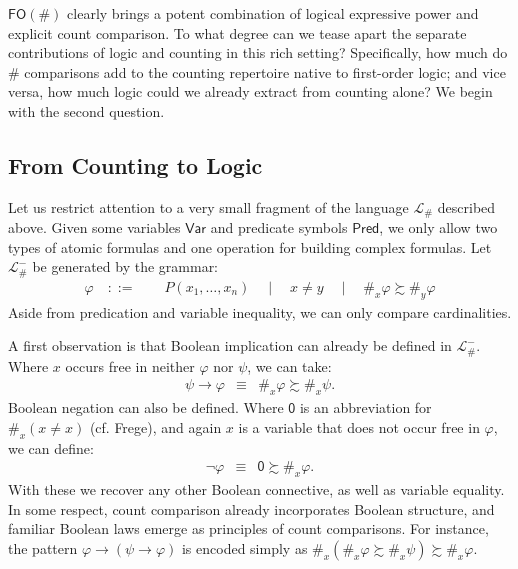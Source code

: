 \documentclass[12pt,oneside,reqno]{amsart}
\theoremstyle{definition}
\begin{document}
$\mathsf{FO}(\#)$ clearly brings a potent combination of logical expressive power and explicit count comparison.  To what degree can we tease apart the separate contributions of  logic and counting in this rich setting? Specifically, how much do $\#$ comparisons add to the counting repertoire native to first-order logic; and vice versa, how much logic could we already extract from counting alone? We begin with the second question. 

\subsection{From Counting to Logic} \label{section:countinglogic}
Let us restrict attention to a very small fragment of the language $\mathcal{L}_\#$ described above. Given some variables $\mathsf{Var}$ and predicate symbols $\mathsf{Pred}$, we only allow two types of atomic formulas and one operation for building complex formulas. Let $\mathcal{L}_\#^-$ be generated by the grammar: \begin{eqnarray*}
\varphi \quad::=\quad\quad   P(x_1,\dots,x_n) \quad\mid\quad x\neq y \quad\mid\quad \#_x\varphi \succsim \#_y\varphi
\end{eqnarray*} Aside from predication and variable inequality, we can only compare cardinalities.

A first observation is that Boolean implication can already be defined in $\mathcal{L}_\#^-$. Where $x$ occurs free in neither $\varphi$ nor $\psi$, we can take: 
\begin{eqnarray}
 \psi \rightarrow \varphi & \equiv & \#_x\varphi \succsim \#_x\psi. \label{implication}
\end{eqnarray}
Boolean negation can also be defined. Where $\mathsf{0}$ is an abbreviation for $\#_x (x \neq x)$ (cf. Frege), and again $x$ is a variable that does not occur free in $\varphi$, we can define: \begin{eqnarray}
\neg \varphi & \equiv & \mathsf{0} \succsim \#_x\varphi. \label{negation}
\end{eqnarray} With these we recover any other Boolean connective, as well as variable equality. In some respect, count comparison already incorporates Boolean structure, and familiar Boolean laws emerge as principles of count comparisons. For instance, the pattern $\varphi \rightarrow (\psi \rightarrow \varphi)$ is encoded simply as $\#_x(\#_x\varphi \succsim \#_x\psi) \succsim \#_x\varphi$. 
\end{document}

